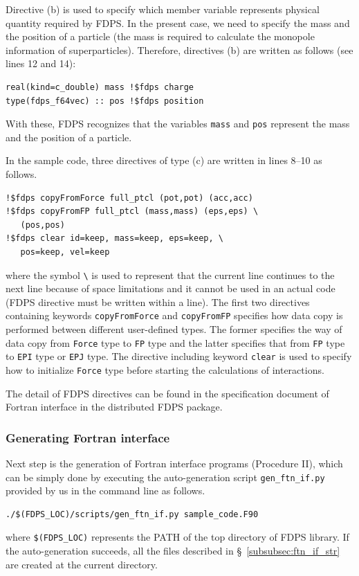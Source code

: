 \documentclass[proof,useamsfonts]{pasj01}
\begin{document}
Directive (b) is used to specify which member variable represents physical quantity required by FDPS. In the present case, we need to specify the mass and the position of a particle (the mass is required to calculate the monopole information of superparticles). Therefore, directives (b) are written as follows (see lines 12 and 14): 
\begin{verbatim}
real(kind=c_double) mass !$fdps charge
type(fdps_f64vec) :: pos !$fdps position
\end{verbatim}
With these, FDPS recognizes that the variables \texttt{mass} and \texttt{pos} represent the mass and the position of a particle. 

In the sample code, three directives of type (c) are written in lines 8--10 as follows.
{\footnotesize
\begin{verbatim}
!$fdps copyFromForce full_ptcl (pot,pot) (acc,acc)
!$fdps copyFromFP full_ptcl (mass,mass) (eps,eps) \
   (pos,pos) 
!$fdps clear id=keep, mass=keep, eps=keep, \
   pos=keep, vel=keep
\end{verbatim}
}
where the symbol \texttt{\textbackslash} is used to represent that the current line continues to the next line because of space limitations and it cannot be used in an actual code (FDPS directive must be written within a line). The first two directives containing keywords \texttt{copyFromForce} and \texttt{copyFromFP} specifies how data copy is performed between different user-defined types. The former specifies the way of data copy from \texttt{Force} type to \texttt{FP} type and the latter specifies that from \texttt{FP} type to \texttt{EPI} type or \texttt{EPJ} type. The directive including keyword \texttt{clear} is used to specify how to initialize \texttt{Force} type before starting the calculations of interactions. 

The detail of FDPS directives can be found in the specification document of Fortran interface in the distributed FDPS package.

\subsubsection{Generating Fortran interface}
\label{subsubsec:gen_ftn_if}
Next step is the generation of Fortran interface programs (Procedure II), which can be simply done by executing the auto-generation script \texttt{gen\_ftn\_if.py} provided by us in the command line as follows.
\begin{verbatim}
./$(FDPS_LOC)/scripts/gen_ftn_if.py sample_code.F90
\end{verbatim}
where \texttt{\$(FDPS\_LOC)} represents the PATH of the top directory of FDPS library. If the auto-generation succeeds, all the files described in \S~\ref{subsubsec:ftn_if_str} are created at the current directory.
\end{document}
